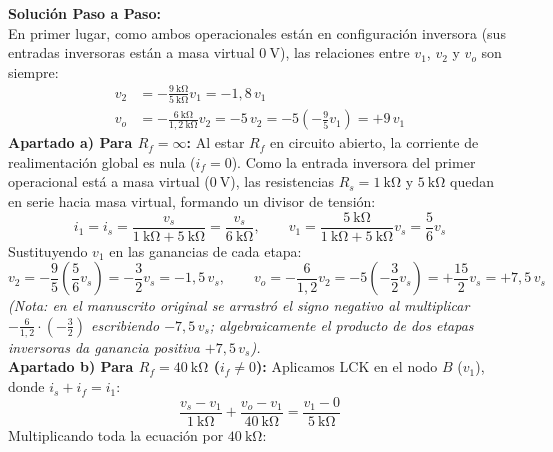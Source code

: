 \begin{ejercicio}
\begin{center}
\end{center}

\textbf{Solución Paso a Paso:}\\[4pt]
En primer lugar, como ambos operacionales están en configuración inversora (sus entradas inversoras están a masa virtual $0\ \si{\volt}$), las relaciones entre $v_1$, $v_2$ y $v_o$ son siempre:
\begin{align}
    v_2 &= -\frac{9\ \si{\kilo\ohm}}{5\ \si{\kilo\ohm}} v_1 = -1{,}8\, v_1 \\
    v_o &= -\frac{6\ \si{\kilo\ohm}}{1{,}2\ \si{\kilo\ohm}} v_2 = -5\, v_2 = -5 \left(-\frac{9}{5} v_1\right) = +9\, v_1
\end{align}
\textbf{Apartado a) Para $R_f = \infty$:}
Al estar $R_f$ en circuito abierto, la corriente de realimentación global es nula ($i_f = 0$). Como la entrada inversora del primer operacional está a masa virtual ($0\ \si{\volt}$), las resistencias $R_s = 1\ \si{\kilo\ohm}$ y $5\ \si{\kilo\ohm}$ quedan en serie hacia masa virtual, formando un divisor de tensión:
\begin{equation}
    i_1 = i_s = \frac{v_s}{1\ \si{\kilo\ohm} + 5\ \si{\kilo\ohm}} = \frac{v_s}{6\ \si{\kilo\ohm}}, \qquad v_1 = \frac{5\ \si{\kilo\ohm}}{1\ \si{\kilo\ohm} + 5\ \si{\kilo\ohm}} v_s = \frac{5}{6} v_s
\end{equation}
Sustituyendo $v_1$ en las ganancias de cada etapa:
\begin{equation}
    v_2 = -\frac{9}{5} \left(\frac{5}{6} v_s\right) = -\frac{3}{2} v_s = -1{,}5\, v_s, \qquad v_o = -\frac{6}{1{,}2} v_2 = -5 \left(-\frac{3}{2} v_s\right) = +\frac{15}{2} v_s = +7{,}5\, v_s
\end{equation}
\textit{(Nota: en el manuscrito original se arrastró el signo negativo al multiplicar $-\frac{6}{1{,}2} \cdot \left(-\frac{3}{2}\right)$ escribiendo $-7{,}5\,v_s$; algebraicamente el producto de dos etapas inversoras da ganancia positiva $+7{,}5\,v_s$).}\\[6pt]
\textbf{Apartado b) Para $R_f = 40\ \si{\kilo\ohm}$ ($i_f \ne 0$):}
Aplicamos LCK en el nodo $B$ ($v_1$), donde $i_s + i_f = i_1$:
\begin{equation}
    \frac{v_s - v_1}{1\ \si{\kilo\ohm}} + \frac{v_o - v_1}{40\ \si{\kilo\ohm}} = \frac{v_1 - 0}{5\ \si{\kilo\ohm}}
\end{equation}
Multiplicando toda la ecuación por $40\ \si{\kilo\ohm}$:

\end{ejercicio}
